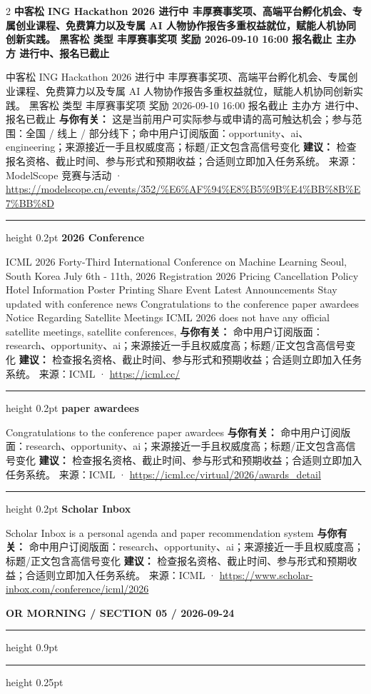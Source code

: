 \documentclass[10.5pt]{ctexart}
\begin{document}
\begin{multicols}{2}
{\large\bfseries 中客松 ING Hackathon 2026 进行中 丰厚赛事奖项、高端平台孵化机会、专属创业课程、免费算力以及专属 AI 人物协作报告多重权益就位，赋能人机协同创新实践。 黑客松 类型 丰厚赛事奖项 奖励 2026-09-10 16:00 报名截止 主办方 进行中、报名已截止}\par
中客松 ING Hackathon 2026 进行中 丰厚赛事奖项、高端平台孵化机会、专属创业课程、免费算力以及专属 AI 人物协作报告多重权益就位，赋能人机协同创新实践。 黑客松 类型 丰厚赛事奖项 奖励 2026-09-10 16:00 报名截止 主办方 进行中、报名已截止
\textbf{与你有关：} 这是当前用户可实际参与或申请的高可触达机会；参与范围：全国 / 线上 / 部分线下；命中用户订阅版面：opportunity、ai、engineering；来源接近一手且权威度高；标题/正文包含高信号变化
\textbf{建议：} 检查报名资格、截止时间、参与形式和预期收益；合适则立即加入任务系统。
{\footnotesize\color{ormuted} 来源：ModelScope 竞赛与活动 · \url{https://modelscope.cn/events/352/%E6%AF%94%E8%B5%9B%E4%BB%8B%E7%BB%8D}}
\vspace{2mm}
\hrule height 0.2pt
\vspace{2mm}
{\large\bfseries 2026 Conference}\par
ICML 2026 Forty-Third International Conference on Machine Learning Seoul, South Korea July 6th - 11th, 2026 Registration 2026 Pricing Cancellation Policy Hotel Information Poster Printing Share Event Latest Announcements Stay updated with conference news Congratulations to the conference paper awardees Notice Regarding Satellite Meetings ICML 2026 does not have any official satellite meetings, satellite conferences, 
\textbf{与你有关：} 命中用户订阅版面：research、opportunity、ai；来源接近一手且权威度高；标题/正文包含高信号变化
\textbf{建议：} 检查报名资格、截止时间、参与形式和预期收益；合适则立即加入任务系统。
{\footnotesize\color{ormuted} 来源：ICML · \url{https://icml.cc/}}
\vspace{2mm}
\hrule height 0.2pt
\vspace{2mm}
{\large\bfseries paper awardees}\par
Congratulations to the conference paper awardees
\textbf{与你有关：} 命中用户订阅版面：research、opportunity、ai；来源接近一手且权威度高；标题/正文包含高信号变化
\textbf{建议：} 检查报名资格、截止时间、参与形式和预期收益；合适则立即加入任务系统。
{\footnotesize\color{ormuted} 来源：ICML · \url{https://icml.cc/virtual/2026/awards_detail}}
\vspace{2mm}
\hrule height 0.2pt
\vspace{2mm}
{\large\bfseries Scholar Inbox}\par
Scholar Inbox is a personal agenda and paper recommendation system
\textbf{与你有关：} 命中用户订阅版面：research、opportunity、ai；来源接近一手且权威度高；标题/正文包含高信号变化
\textbf{建议：} 检查报名资格、截止时间、参与形式和预期收益；合适则立即加入任务系统。
{\footnotesize\color{ormuted} 来源：ICML · \url{https://www.scholar-inbox.com/conference/icml/2026}}
\end{multicols}
\newpage
{\small\bfseries OR MORNING / SECTION 05 / 2026-09-24}
\vspace{2mm}
\hrule height 0.9pt
\vspace{1.5mm}
\hrule height 0.25pt
\vspace{4mm}
\end{document}
